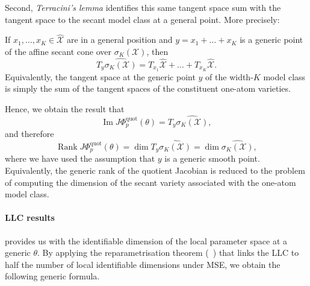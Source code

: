 Second, \textit{Terracini's lemma} identifies this same tangent space sum with the tangent space to the secant model class at a general point.
More precisely:
\begin{theorem}
    If $x_{1}, \dots, x_{K} \in \widehat{\mathcal X}$ are in a general position and $y=x_{1} + \dots + x_{K}$ is a generic  point of the affine secant cone over $\sigma_{K}(\mathcal X)$, then
    \begin{equation}
        T_{y} \widehat{\sigma_{K}(\mathcal X)} = T_{x_{1}}\widehat{\mathcal X} + \dots + T_{x_{K}}\widehat{\mathcal X}.
    \end{equation}
    Equivalently, the tangent space at the generic point $y$ of the width-$K$ model class is simply the sum of the tangent spaces of the constituent one-atom varieties.
\end{theorem}
Hence, we obtain the result that
\begin{equation}
    \operatorname{Im} J \Phi_{p}^{\operatorname{quot}}(\theta) = T_{y} \widehat{\sigma_{K}(\mathcal X)},
\end{equation}
and therefore
\begin{equation}\label{eq: secant dimension}
    \operatorname{Rank} J \Phi_{p}^{\operatorname{quot}}(\theta) = \dim T_{y} \widehat{\sigma_{K}(\mathcal X)} = \dim \widehat{\sigma_{K}(\mathcal X)},
\end{equation}
where we have used the assumption that $y$ is a generic smooth point.
Equivalently, the generic rank of the quotient Jacobian is reduced to the problem of computing the dimension of the secant variety associated with the one-atom model class.

\paragraph{LLC results}

 provides us with the identifiable dimension of the local parameter space at a generic $\theta$.
By applying the reparametrisation theorem (~) that links the LLC to half the number of local identifiable dimensions under MSE, we obtain the following generic formula.

